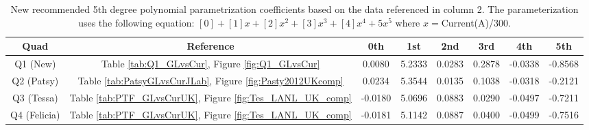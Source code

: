 \documentclass[12pt]{article}
\begin{document}
\begin{table}[!h]
\centering
\caption{\label{tab:new_param}New recommended 5th degree polynomial parametrization coefficients based on the data referenced in column 2. The parameterization uses the following equation: $[0]+[1]x+[2]x^2+[3]x^3+[4]x^4+5x^5$ where $x=$Current(A)/300.}
\begin{tabular}{|c|c|cccccc|}
\hline
Quad & Reference&0th&1st&2nd&3rd&4th&5th\\\hline
Q1 (New) &Table \ref{tab:Q1_GLvsCur}, Figure \ref{fig:Q1_GLvsCur} &0.0080&5.2333&0.0283&0.2878&-0.0338&-0.8568\\
Q2 (Patsy)&Table \ref{tab:PatsyGLvsCurJLab}, Figure \ref{fig:Pasty2012UKcomp}               &0.0234&5.3544&0.0135&0.1038&-0.0318&-0.2121\\
Q3 (Tessa)&Table \ref{tab:PTF_GLvsCurUK},  Figure \ref{fig:Tes_LANL_UK_comp}&-0.0180 &5.0696&0.0883&0.0290&-0.0497&-0.7211\\
Q4 (Felicia)&Table \ref{tab:PTF_GLvsCurUK},  Figure \ref{fig:Tes_LANL_UK_comp}&-0.0181&5.1142&0.0887&0.0400&-0.0499&-0.7516\\\hline
\end{tabular}
\end{table}

%


\end{document}
